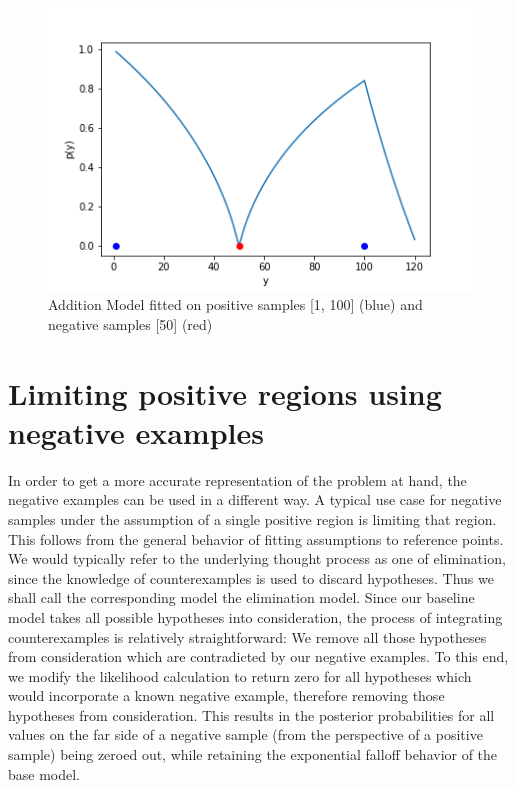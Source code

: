 \documentclass[12pt, ]{scrartcl}
\begin{document}
\begin{multicols}{2}
\begin{figure}[H]
	\includegraphics[scale=0.5]{graphics/addition_model_multiple_regions}
	\caption{Addition Model fitted on positive samples [1, 100] (blue) and negative samples [50] (red)}
	\label{fig:add2}
\end{figure}
	 
	
\section{Limiting positive regions using negative examples}\label{sec:elim}
In order to get a more accurate representation of the problem at hand, the negative examples can be used in a different way.
A typical use case for negative samples under the assumption of a single positive region is limiting that region. 
This follows from the general behavior of fitting assumptions to reference points.
We would typically refer to the underlying thought process as one of elimination, since the knowledge of counterexamples is used to discard hypotheses.
Thus we shall call the corresponding model the elimination model.
Since our baseline model takes all possible hypotheses into consideration, the process of integrating counterexamples is relatively straightforward: We remove all those hypotheses from consideration which are contradicted by our negative examples.
To this end, we modify the likelihood calculation to return zero for all hypotheses which would incorporate a known negative example, therefore removing those hypotheses from consideration.
This results in the posterior probabilities for all values on the far side of a negative sample (from the perspective of a positive sample) being zeroed out, while retaining the exponential falloff behavior of the base model.


\end{multicols}
\end{document}
